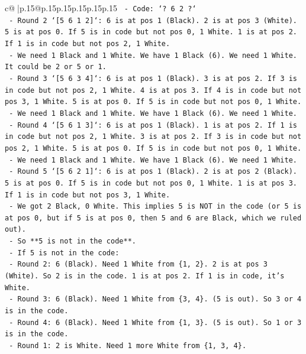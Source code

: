 \documentclass{article}
\begin{document}
{\begin{supertabular}{c@{$\;$}|p{.15\linewidth}@{}p{.15\linewidth}p{.15\linewidth}p{.15\linewidth}p{.15\linewidth}p{.15\linewidth}}
{{{\texttt{                {-} Code: `? 6 2 ?`} \\
\texttt{                {-} Round 2 `{[}5 6 1 2{]}`: 6 is at pos 1 (Black). 2 is at pos 3 (White). 5 is at pos 0. If 5 is in code but not pos 0, 1 White. 1 is at pos 2. If 1 is in code but not pos 2, 1 White.} \\
\texttt{                {-} We need 1 Black and 1 White. We have 1 Black (6). We need 1 White. It could be 2 or 5 or 1.} \\
\texttt{                {-} Round 3 `{[}5 6 3 4{]}`: 6 is at pos 1 (Black). 3 is at pos 2. If 3 is in code but not pos 2, 1 White. 4 is at pos 3. If 4 is in code but not pos 3, 1 White. 5 is at pos 0. If 5 is in code but not pos 0, 1 White.} \\
\texttt{                {-} We need 1 Black and 1 White. We have 1 Black (6). We need 1 White.} \\
\texttt{                {-} Round 4 `{[}5 6 1 3{]}`: 6 is at pos 1 (Black). 1 is at pos 2. If 1 is in code but not pos 2, 1 White. 3 is at pos 2. If 3 is in code but not pos 2, 1 White. 5 is at pos 0. If 5 is in code but not pos 0, 1 White.} \\
\texttt{                {-} We need 1 Black and 1 White. We have 1 Black (6). We need 1 White.} \\
\texttt{                {-} Round 5 `{[}5 6 2 1{]}`: 6 is at pos 1 (Black). 2 is at pos 2 (Black). 5 is at pos 0. If 5 is in code but not pos 0, 1 White. 1 is at pos 3. If 1 is in code but not pos 3, 1 White.} \\
\texttt{                {-} We got 2 Black, 0 White. This implies 5 is NOT in the code (or 5 is at pos 0, but if 5 is at pos 0, then 5 and 6 are Black, which we ruled out).} \\
\texttt{                {-} So **5 is not in the code**.} \\
\texttt{                {-} If 5 is not in the code:} \\
\texttt{                    {-} Round 2: 6 (Black). Need 1 White from \{1, 2\}. 2 is at pos 3 (White). So 2 is in the code. 1 is at pos 2. If 1 is in code, it's White.} \\
\texttt{                    {-} Round 3: 6 (Black). Need 1 White from \{3, 4\}. (5 is out). So 3 or 4 is in the code.} \\
\texttt{                    {-} Round 4: 6 (Black). Need 1 White from \{1, 3\}. (5 is out). So 1 or 3 is in the code.} \\
\texttt{                    {-} Round 1: 2 is White. Need 1 more White from \{1, 3, 4\}.} \\
}}}
\end{supertabular}}
\end{document}
